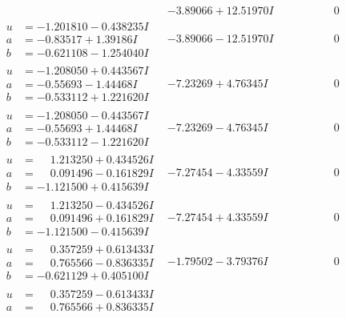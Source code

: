\documentclass[1p]{elsarticle_modified}
\theoremstyle{definition}
\begin{document}
$$\begin{array}{c|c|c}
 & -3.89066 + 12.51970 I & \phantom{-0.000000 } 0 \\ \hline\begin{aligned}
u &= -1.201810 - 0.438235 I \\
a &= -0.83517 + 1.39186 I \\
b &= -0.621108 - 1.254040 I\end{aligned}
 & -3.89066 - 12.51970 I & \phantom{-0.000000 } 0 \\ \hline\begin{aligned}
u &= -1.208050 + 0.443567 I \\
a &= -0.55693 - 1.44468 I \\
b &= -0.533112 + 1.221620 I\end{aligned}
 & -7.23269 + 4.76345 I & \phantom{-0.000000 } 0 \\ \hline\begin{aligned}
u &= -1.208050 - 0.443567 I \\
a &= -0.55693 + 1.44468 I \\
b &= -0.533112 - 1.221620 I\end{aligned}
 & -7.23269 - 4.76345 I & \phantom{-0.000000 } 0 \\ \hline\begin{aligned}
u &= \phantom{-}1.213250 + 0.434526 I \\
a &= \phantom{-}0.091496 - 0.161829 I \\
b &= -1.121500 + 0.415639 I\end{aligned}
 & -7.27454 - 4.33559 I & \phantom{-0.000000 } 0 \\ \hline\begin{aligned}
u &= \phantom{-}1.213250 - 0.434526 I \\
a &= \phantom{-}0.091496 + 0.161829 I \\
b &= -1.121500 - 0.415639 I\end{aligned}
 & -7.27454 + 4.33559 I & \phantom{-0.000000 } 0 \\ \hline\begin{aligned}
u &= \phantom{-}0.357259 + 0.613433 I \\
a &= \phantom{-}0.765566 - 0.836335 I \\
b &= -0.621129 + 0.405100 I\end{aligned}
 & -1.79502 - 3.79376 I & \phantom{-0.000000 } 0 \\ \hline\begin{aligned}
u &= \phantom{-}0.357259 - 0.613433 I \\
a &= \phantom{-}0.765566 + 0.836335 I \\

\end{aligned}
\end{array}$$
\end{document}
